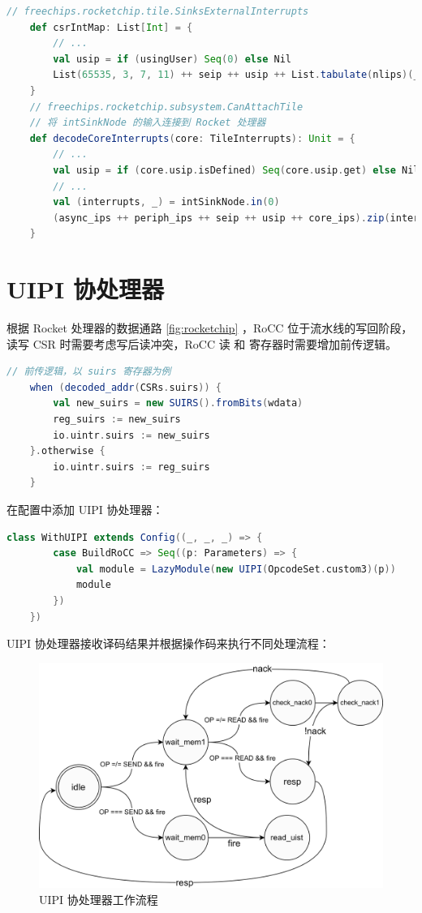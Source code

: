\begin{lstlisting}[style=CStyle,language=scala]
    // freechips.rocketchip.tile.SinksExternalInterrupts
    def csrIntMap: List[Int] = {
        // ...
        val usip = if (usingUser) Seq(0) else Nil
        List(65535, 3, 7, 11) ++ seip ++ usip ++ List.tabulate(nlips)(_ + 16)
    }
    // freechips.rocketchip.subsystem.CanAttachTile
    // 将 intSinkNode 的输入连接到 Rocket 处理器
    def decodeCoreInterrupts(core: TileInterrupts): Unit = {
        // ...
        val usip = if (core.usip.isDefined) Seq(core.usip.get) else Nil
        // ...
        val (interrupts, _) = intSinkNode.in(0)
        (async_ips ++ periph_ips ++ seip ++ usip ++ core_ips).zip(interrupts).foreach { case(c, i) => c := i }
    }
\end{lstlisting}

\section{UIPI 协处理器}

根据 Rocket 处理器的数据通路 \ref{fig:rocketchip} ，RoCC 位于流水线的写回阶段，读写 CSR 时需要考虑写后读冲突，RoCC 读 \Rsuirs 和 \Rsuist 寄存器时需要增加前传逻辑。

\begin{lstlisting}[style=CStyle,language=scala]
    // 前传逻辑，以 suirs 寄存器为例
    when (decoded_addr(CSRs.suirs)) {
        val new_suirs = new SUIRS().fromBits(wdata)
        reg_suirs := new_suirs
        io.uintr.suirs := new_suirs
    }.otherwise {
        io.uintr.suirs := reg_suirs
    }
\end{lstlisting}

在配置中添加 UIPI 协处理器：

\begin{lstlisting}[style=CStyle,language=scala]
    class WithUIPI extends Config((_, _, _) => {
        case BuildRoCC => Seq((p: Parameters) => {
            val module = LazyModule(new UIPI(OpcodeSet.custom3)(p))
            module
        })
    })
\end{lstlisting}

UIPI 协处理器接收译码结果并根据操作码来执行不同处理流程：

\begin{figure}
    \centering
    \includegraphics[width=0.5\linewidth]{figures/uintr3.png}
    \caption{UIPI 协处理器工作流程}
    \label{fig:uintr3}
\end{figure}


